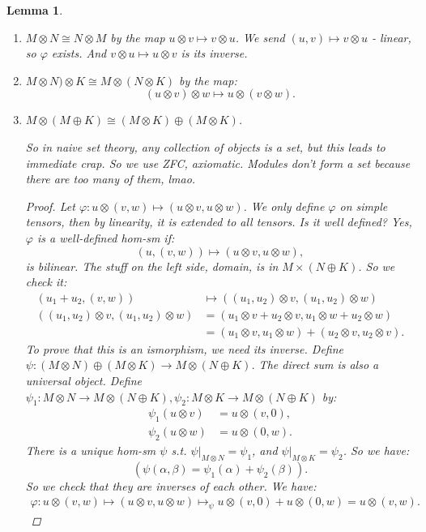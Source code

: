 \documentclass[9pt,reqno,twoside]{amsbook}
\theoremstyle{plain}
\numberwithin{section}{chapter}
\numberwithin{equation}{chapter}
\newtheorem{lem}[theorem]{Lemma}
\theoremstyle{definition}
\newtheorem{Ex}[theorem]{Example}
\theoremstyle{remark}
\theoremstyle{plain}
\newcommand{\z}{\mathbb{Z}}
\newcommand{\bee}{\begin{equation}\begin{aligned}}
\newcommand{\eee}{\end{aligned}\end{equation}}
\newcommand{\tens}{\otimes}
\renewcommand{\phi}{\varphi}
\begin{document}
\begin{lem}
\begin{enumerate}
\begin{proof}
\begin{Ex} The same tensor can be written in several ways as a sum of simple tensors, in $\z \tens \z$:
$$
5 \tens 6 = 2 \tens 6 + 3 \tens 6.
$$
The left hand side is sent to $30$, but we need it to be bilinear or something. 

\end{Ex}

So the inverse is a homomorphism, $M \to M \tens R$. It is an inverse, since if we start with a tensor, send it to the $v \tens 1$ in Equation \ref{eqn10.17}, we get: 
$$
\sum a_i(u_i \tens b_i) \mapsto^\phi \sum a_ib_iu_i \mapsto^{\phi^{-1}} (\sum a_ib_iu_i)\tens 1.
$$
\end{proof}

\item $M \tens N \cong N \tens M$ by the map $u \tens v \mapsto v \tens u$. We send $(u,v) \mapsto v \tens u$ - linear, so $\phi$ exists. And $v \tens u \mapsto u \tens v$ is its inverse. 

\item $M \tens N) \tens K \cong M \tens (N \tens K)$ by the map: 
$$
(u \tens v) \tens w \mapsto u \tens (v \tens w).
$$

\item $M \tens (M \oplus K) \cong (M \tens K) \oplus (M \tens K)$. 

So in naive set theory, any collection of objects is a set, but this leads to immediate crap. So we use ZFC, axiomatic. Modules don't form a set because there are too many of them, lmao. 

\begin{proof}
Let $\phi:u \tens (v,w) \mapsto (u\tens v,u \tens w)$. We only define $\phi$ on simple tensors, then by linearity, it is extended to all tensors. Is it well defined? Yes, $\phi$ is a well-defined hom-sm if:
$$
(u,(v,w)) \mapsto (u \tens v,u \tens w),
$$
 is bilinear. The stuff on the left side, domain, is  in $M \times (N \oplus K)$. So we check it: 
\bee
(u_1 + u_2,(v,w)) &\mapsto ((u_1,u_2) \tens v,(u_1,u_2) \tens w)\\
 ((u_1,u_2) \tens v,(u_1,u_2) \tens w) &= (u_1 \tens v + u_2 \tens v, u_1 \tens w + u_2 \tens w)\\
&= (u_1 \tens v,u_1 \tens w) + (u_2 \tens v, u_2 \tens v).
\eee
To prove that this is an ismorphism, we need its inverse. Define $\psi: (M \tens N) \oplus (M \tens K) \to M \tens (N \oplus K)$. The direct sum is also a universal object. Define $\psi_1: M \tens N \to M \tens (N \oplus K),\psi_2: M \tens K \to M \tens (N \oplus K)$ by: 
\bee
\psi_1(u \tens v) &= u \tens (v,0),\\
\psi_2(u \tens w) &= u \tens (0,w).
\eee
There is a unique hom-sm $\psi$ s.t. $\psi|_{M \tens N} = \psi_1$, and $\psi|_{M \tens K} = \psi_2$. So we have: 
$$
(\psi(\alpha,\beta) = \psi_1(\alpha) + \psi_2(\beta)).
$$
So we check that they are inverses of each other. We have: 
\bee
\phi:u \tens (v,w) \mapsto (u\tens v,u \tens w) \mapsto_\psi u \tens (v,0) + u \tens (0,w) = u \tens (v,w).
\eee
\end{proof}
\end{enumerate}
\end{lem}
\end{document}
